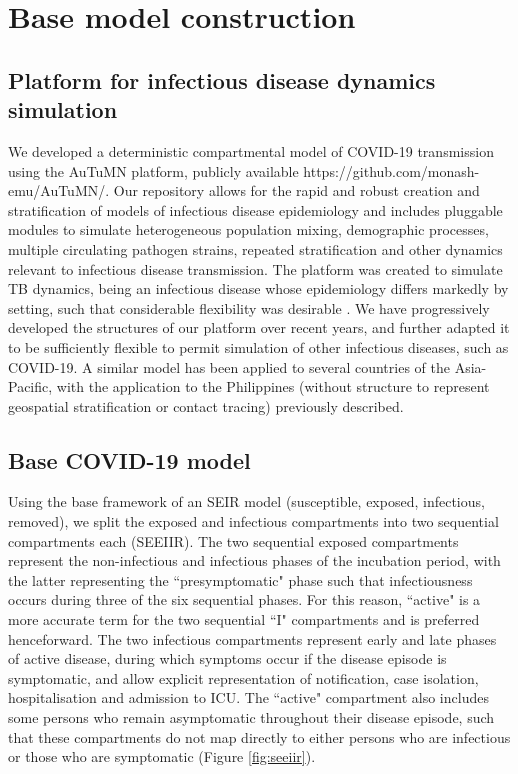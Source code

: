 \section{Base model construction}
\subsection{Platform for infectious disease dynamics simulation}

We developed a deterministic compartmental model of COVID-19 transmission using the AuTuMN platform,
publicly available https://github.com/monash-emu/AuTuMN/.
Our repository allows for the rapid and robust creation and stratification of models of infectious disease epidemiology and includes pluggable modules to simulate heterogeneous population mixing, demographic processes, multiple circulating pathogen strains, repeated stratification and other dynamics relevant to infectious disease transmission.
The platform was created to simulate TB dynamics, being an infectious disease whose epidemiology differs markedly by setting, such that considerable flexibility was desirable \cite{RN18}.
We have progressively developed the structures of our platform over recent years, and further adapted it to be sufficiently flexible to permit simulation of other infectious diseases, such as COVID-19. A similar model has been applied to several countries of the Asia-Pacific, with the application to the Philippines (without structure to represent geospatial stratification or contact tracing) previously described.\cite{RN79}

\subsection{Base COVID-19 model}
Using the base framework of an SEIR model (susceptible, exposed, infectious, removed), we split the exposed and infectious compartments into two sequential compartments each (SEEIIR). The two sequential exposed compartments represent the non-infectious and infectious phases of the incubation period, with the latter representing the ``presymptomatic" phase such that infectiousness occurs during three of the six sequential phases. For this reason, ``active" is a more accurate term for the two sequential ``I" compartments and is preferred henceforward. The two infectious compartments represent early and late phases of active disease, during which symptoms occur if the disease episode is symptomatic, and allow explicit representation of notification, case isolation, hospitalisation and admission to ICU. The ``active" compartment also includes some persons who remain asymptomatic throughout their disease episode, such that these compartments do not map directly to either persons who are infectious or those who are symptomatic (Figure \ref{fig:seeiir}).

